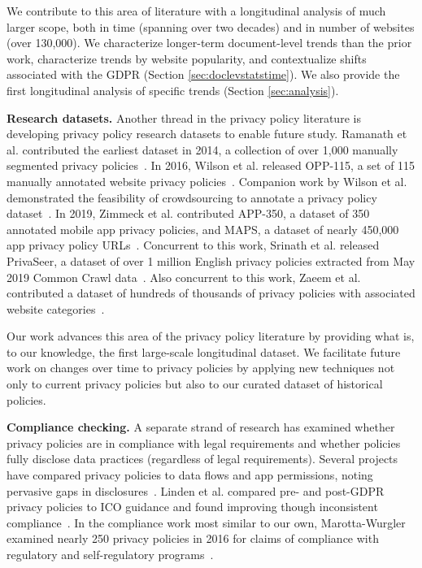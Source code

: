 We contribute to this area of literature with a longitudinal analysis of much larger scope, both in time (spanning over two decades) and in number of websites (over 130,000). We characterize longer-term document-level trends than the prior work, characterize trends by website popularity, and contextualize shifts associated with the GDPR (Section \ref{sec:doclevstatstime}). We also provide the first longitudinal analysis of specific trends (Section \ref{sec:analysis}).

\textbf{Research datasets.}
Another thread in the privacy policy literature is developing privacy policy research datasets to enable future study. Ramanath et al. contributed the earliest dataset in 2014, a collection of over 1,000 manually segmented privacy policies~\cite{ramanath2014unsupervised}. In 2016, Wilson et al. released OPP-115, a set of 115 manually annotated website privacy policies~\cite{wilson2016creation}. Companion work by Wilson et al. demonstrated the feasibility of crowdsourcing to annotate a privacy policy dataset~\cite{wilson2016crowdsourcing}. In 2019, Zimmeck et al. contributed APP-350, a dataset of 350 annotated mobile app privacy policies, and MAPS, a dataset of nearly 450,000 app privacy policy URLs~\cite{zimmeck2019}. Concurrent to this work, Srinath et al. released PrivaSeer, a dataset of over 1 million English privacy policies extracted from May 2019 Common Crawl data~\cite{srinath2020}. Also concurrent to this work, Zaeem et al. contributed a dataset of hundreds of thousands of privacy policies with associated website categories~\cite{zaeemlarge}.

Our work advances this area of the privacy policy literature by providing what is, to our knowledge, the first large-scale longitudinal dataset. We facilitate future work on changes over time to privacy policies by applying new techniques not only to current privacy policies but also to our curated dataset of historical policies.

\textbf{Compliance checking.}
A separate strand of research has examined whether privacy policies are in compliance with legal requirements and whether policies fully disclose data practices (regardless of legal requirements). Several projects have compared privacy policies to data flows and app permissions, noting pervasive gaps in disclosures~\cite{slavin2016, zimmeck2019}. Linden et al. compared pre- and post-GDPR privacy policies to ICO guidance and found improving though inconsistent compliance~\cite{linden2020privacy}. In the compliance work most similar to our own, Marotta-Wurgler examined nearly 250 privacy policies in 2016 for claims of compliance with regulatory and self-regulatory programs~\cite{marotta-wurgler2016}.


